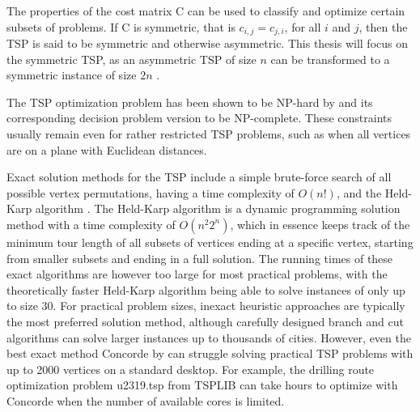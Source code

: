 \documentclass[english, 12pt, a4paper, sci, utf8, a-1b, online]{aaltothesis}
\begin{document}
The properties of the cost matrix C can be used to classify and optimize certain subsets of problems. If C is symmetric, that is $c_{i, j} = c_{j, i}$, for all $i$ and $j$, then the TSP is said to be symmetric and otherwise asymmetric. This thesis will focus on the symmetric TSP, as an asymmetric TSP of size $n$ can be transformed to a symmetric instance of size $2n$ \cite{JONKER1983161}.

The TSP optimization problem has been shown to be NP-hard by \cite{nphard} and its corresponding decision problem version to be NP-complete. These constraints usually remain even for rather restricted TSP problems, such as when all vertices are on a plane with Euclidean distances.

Exact solution methods for the TSP include a simple brute-force search of all possible vertex permutations, having a time complexity of $O(n!)$, and the Held-Karp algorithm \cite{heldkarp}. The Held-Karp algorithm is a dynamic programming solution method with a time complexity of $O(n^2 2^n)$, which in essence keeps track of the minimum tour length of all subsets of vertices ending at a specific vertex, starting from smaller subsets and ending in a full solution. The running times of these exact algorithms are however too large for most practical problems, with the theoretically faster Held-Karp algorithm being able to solve instances of only up to size 30. For practical problem sizes, inexact heuristic approaches are typically the most preferred solution method, although carefully designed branch and cut algorithms can solve larger instances up to thousands of cities. However, even the best exact method Concorde by \cite{Applegate2006} can struggle solving practical TSP problems with up to 2000 vertices on a standard desktop. For example, the drilling route optimization problem u2319.tsp from TSPLIB \cite{Rein91} can take hours to optimize with Concorde when the number of available cores is limited.
\end{document}
